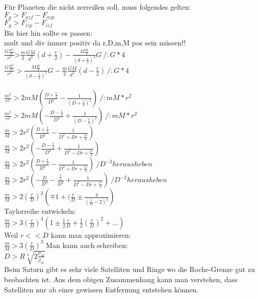 Für Planeten die nicht zerreißen soll, muss folgendes gelten:\\
$F_g > F_{azf} - F_{azp}$\\
$F_g > F_{izp} - F_{izf}$\\
Bis hier hin sollte es passen:\\
mult und div immer positiv da r,D,m,M pos sein müssen!!\\
$\frac{G\frac{m^2}{4}}{r^2}\text{>}\frac{m}{2}\frac{G M}{d^3}\left(d+\frac{r}{2}\right) - \frac{M \frac{m}{2}}{\left(d+\frac{r}{2}\right)^2}G ~ / :G *4$ \\
$\frac{G\frac{m^2}{4}}{r^2}> \frac{M \frac{m}{2}}{\left(d-\frac{r}{2}\right)^2}G-\frac{m}{2}\frac{G M}{d^3}\left(d-\frac{r}{2}\right) ~ / :G *4$\\
\\
$\frac{m^2}{r^2}>2 m M \left(\frac{D+\frac{r}{2}}{D^3}-\frac{1}{\left(D+\frac{r}{2}\right)^2}\right)~/:mM *r^2$ \\ 
$\frac{m^2}{r^2}>2 m M \left(-\frac{D-\frac{r}{2}}{D^3}+\frac{1}{\left(D-\frac{r}{2}\right)^2}\right)~/:mM *r^2$\\
$\frac{m}{M}>2 r^2 \left(\frac{D+\frac{r}{2}}{D^3}-\frac{1}{D^2+D r+\frac{r^2}{4}}\right)$ \\ 
$\frac{m}{M}>2 r^2 \left(-\frac{D-\frac{r}{2}}{D^3}+\frac{1}{D^2-D r+\frac{r^2}{4}}\right)$\\
$\frac{m}{M}>2 r^2 \left(\frac{D+\frac{r}{2}}{D^3}-\frac{1}{D^2+D r+\frac{r^2}{4}}\right)~/D^{-2} herausheben$ \\ 
$\frac{m}{M}>2 r^2 \left(-\frac{D}{D^3} -\frac{\frac{r}{2}}{D^3} +\frac{1}{D^2-D r+\frac{r^2}{4}}\right)~/D^{-2} herausheben$\\
$\frac{m}{M}>2 \left(\frac{r}{D}\right)^2 \left(\mp 1 + (\frac{r}{D} \pm \frac{4}{\left(\frac{r}{D}-2\right)^2}\right)$ \\ 
Taylorreihe entwickeln:\\
$\frac{m}{M}>3 \left(\frac{r}{D}\right)^3 \left( 1 \pm \frac{1}{2}\frac{r}{D} + \frac{1}{2}\left(\frac{r}{D}\right)^2 + ... \right)$ \\ 
Weil $r << D$ kann man approximieren:\\
$\frac{m}{M}>3 \left(\frac{r}{D}\right)^3$
Man kann auch schreiben:\\
$D > R \sqrt[3]{2 \frac{\rho_M}{\rho_m}}$\textsuperscript{\cite{wiki:xxx}}\\
Beim Saturn gibt es sehr viele Satelliten und Ringe wo die Roche-Grenze gut zu beobachten ist. Aus dem obigen Zusammenhang kann man verstehen, dass Satelliten nur ab einer gewissen Entfernung entstehen können. 
